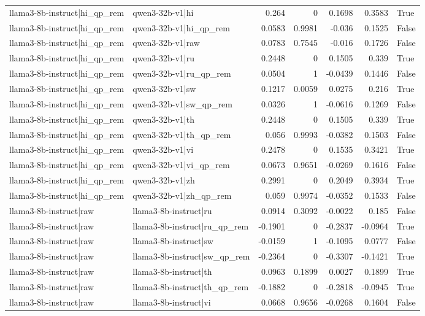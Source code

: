 \begin{table}
\begin{tabular}{l l r r r r l}
llama3-8b-instruct|hi_qp_rem & qwen3-32b-v1|hi & 0.264 & 0 & 0.1698 & 0.3583 & True \\
llama3-8b-instruct|hi_qp_rem & qwen3-32b-v1|hi_qp_rem & 0.0583 & 0.9981 & -0.036 & 0.1525 & False \\
llama3-8b-instruct|hi_qp_rem & qwen3-32b-v1|raw & 0.0783 & 0.7545 & -0.016 & 0.1726 & False \\
llama3-8b-instruct|hi_qp_rem & qwen3-32b-v1|ru & 0.2448 & 0 & 0.1505 & 0.339 & True \\
llama3-8b-instruct|hi_qp_rem & qwen3-32b-v1|ru_qp_rem & 0.0504 & 1 & -0.0439 & 0.1446 & False \\
llama3-8b-instruct|hi_qp_rem & qwen3-32b-v1|sw & 0.1217 & 0.0059 & 0.0275 & 0.216 & True \\
llama3-8b-instruct|hi_qp_rem & qwen3-32b-v1|sw_qp_rem & 0.0326 & 1 & -0.0616 & 0.1269 & False \\
llama3-8b-instruct|hi_qp_rem & qwen3-32b-v1|th & 0.2448 & 0 & 0.1505 & 0.339 & True \\
llama3-8b-instruct|hi_qp_rem & qwen3-32b-v1|th_qp_rem & 0.056 & 0.9993 & -0.0382 & 0.1503 & False \\
llama3-8b-instruct|hi_qp_rem & qwen3-32b-v1|vi & 0.2478 & 0 & 0.1535 & 0.3421 & True \\
llama3-8b-instruct|hi_qp_rem & qwen3-32b-v1|vi_qp_rem & 0.0673 & 0.9651 & -0.0269 & 0.1616 & False \\
llama3-8b-instruct|hi_qp_rem & qwen3-32b-v1|zh & 0.2991 & 0 & 0.2049 & 0.3934 & True \\
llama3-8b-instruct|hi_qp_rem & qwen3-32b-v1|zh_qp_rem & 0.059 & 0.9974 & -0.0352 & 0.1533 & False \\
llama3-8b-instruct|raw & llama3-8b-instruct|ru & 0.0914 & 0.3092 & -0.0022 & 0.185 & False \\
llama3-8b-instruct|raw & llama3-8b-instruct|ru_qp_rem & -0.1901 & 0 & -0.2837 & -0.0964 & True \\
llama3-8b-instruct|raw & llama3-8b-instruct|sw & -0.0159 & 1 & -0.1095 & 0.0777 & False \\
llama3-8b-instruct|raw & llama3-8b-instruct|sw_qp_rem & -0.2364 & 0 & -0.3307 & -0.1421 & True \\
llama3-8b-instruct|raw & llama3-8b-instruct|th & 0.0963 & 0.1899 & 0.0027 & 0.1899 & True \\
llama3-8b-instruct|raw & llama3-8b-instruct|th_qp_rem & -0.1882 & 0 & -0.2818 & -0.0945 & True \\
llama3-8b-instruct|raw & llama3-8b-instruct|vi & 0.0668 & 0.9656 & -0.0268 & 0.1604 & False \\

\end{tabular}
\end{table}
